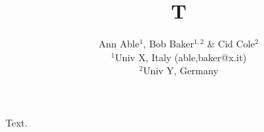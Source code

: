 \documentclass{mn2e}
\begin{document}
\title{T}
\author[A. Able et al.]{Ann Able$^{1}$, Bob Baker$^{1,2}$ \& Cid Cole$^{2}$\\
$^{1}$Univ X, Italy (able,baker@x.it)\\
$^{2}$Univ Y, Germany}
\maketitle
Text.
\end{document}
